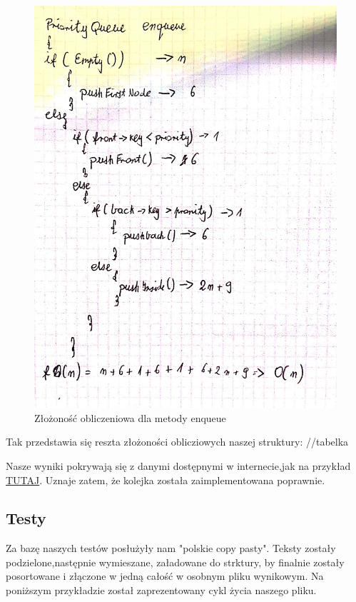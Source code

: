\documentclass{article}
\begin{document}
\begin{figure}[H]
    \centering
    \hspace*{-1cm}
    \includegraphics[totalheight=10cm]{zlozonosc.jpg}
    \caption{Złożoność obliczeniowa dla metody enqueue}
    \label{2}
\end{figure}

Tak przedstawia się reszta złożoności oblicziowych naszej struktury:
//tabelka

Nasze wyniki pokrywają się z danymi dostępnymi w internecie,jak na przykład 
\href{https://eduinf.waw.pl/inf/alg/001_search/0106.php}{TUTAJ}. Uznaje zatem,
że kolejka została zaimplementowana poprawnie.


\subsection{Testy}
Za bazę naszych testów posłużyły nam "polskie copy pasty". Teksty zostały podzielone,następnie wymieszane, załadowane do strktury,
by finalnie zostały posortowane i złączone w jedną całość w osobnym pliku wynikowym. Na poniższym przykładzie
został zaprezentowany cykl życia naszego pliku.
\end{document}

